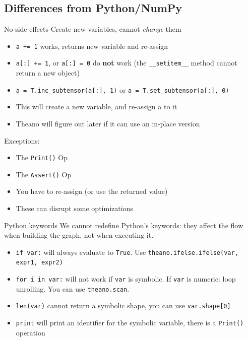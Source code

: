 \documentclass[a4paper,9pt]{beamer}
\begin{document}
\subsection{Differences from Python/NumPy}
\begin{frame}[fragile]{No side effects}
  Create new variables, cannot \emph{change} them
  \begin{itemize}
    \item \verb|a += 1| works, returns new variable and re-assign
    \item \verb|a[:] += 1|, or \verb|a[:] = 0| do \textbf{not} work
      (the \verb|__setitem__| method cannot return a new object)
    \item \verb|a = T.inc_subtensor(a[:], 1)| or \verb|a = T.set_subtensor(a[:], 0)|
    \item This will create a new variable, and re-assign a to it
    \item Theano will figure out later if it can use an in-place version
  \end{itemize}
  Exceptions:
  \begin{itemize}
    \item The \verb|Print()| Op
    \item The \verb|Assert()| Op
    \item You have to re-assign (or use the returned value)
    \item These can disrupt some optimizations
  \end{itemize}
\end{frame}

\begin{frame}[fragile]{Python keywords}
  We cannot redefine Python's keywords: they affect the flow when building the graph, not when executing it.
  \begin{itemize}
    \item \verb|if var:| will always evaluate to \verb|True|.
      Use \verb|theano.ifelse.ifelse(var, expr1, expr2)|
    \item \verb|for i in var:| will not work if \verb|var| is symbolic.
      If \verb|var| is numeric: loop unrolling. You can use \verb|theano.scan|.
    \item \verb|len(var)| cannot return a symbolic shape, you can use
      \verb|var.shape[0]|
    \item \verb|print| will print an identifier for the symbolic variable,
      there is a \verb|Print()| operation
  \end{itemize}
\end{frame}
\end{document}
